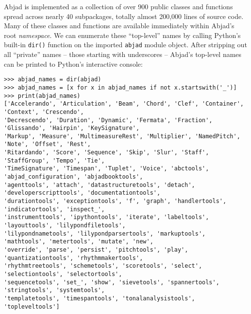 \noindent Abjad is implemented as a collection of over 900 public classes and
functions spread across nearly 40 subpackages, totally almost 200,000 lines of
source code. Many of these classes and functions are available immediately
within Abjad's root \emph{namespace}. We can enumerate these
\enquote{top-level} names by calling Python's built-in \texttt{dir()} function
on the imported \texttt{abjad} module object. After stripping out all
\enquote{private} names -- those starting with underscores -- Abjad's top-level
names can be printed to Python's interactive console:

\begin{comment}
<abjad>[text_width=105]
abjad_names = dir(abjad)
abjad_names = [x for x in abjad_names if not x.startswith('_')]
print(abjad_names)
</abjad>
\end{comment}

\begin{abjadbookoutput}
\begin{singlespacing}
\vspace{-0.5\baselineskip}
\begin{lstlisting}
>>> abjad_names = dir(abjad)
>>> abjad_names = [x for x in abjad_names if not x.startswith('_')]
>>> print(abjad_names)
['Accelerando', 'Articulation', 'Beam', 'Chord', 'Clef', 'Container', 'Context', 'Crescendo',
'Decrescendo', 'Duration', 'Dynamic', 'Fermata', 'Fraction', 'Glissando', 'Hairpin', 'KeySignature',
'Markup', 'Measure', 'MultimeasureRest', 'Multiplier', 'NamedPitch', 'Note', 'Offset', 'Rest',
'Ritardando', 'Score', 'Sequence', 'Skip', 'Slur', 'Staff', 'StaffGroup', 'Tempo', 'Tie',
'TimeSignature', 'Timespan', 'Tuplet', 'Voice', 'abctools', 'abjad_configuration', 'abjadbooktools',
'agenttools', 'attach', 'datastructuretools', 'detach', 'developerscripttools', 'documentationtools',
'durationtools', 'exceptiontools', 'f', 'graph', 'handlertools', 'indicatortools', 'inspect_',
'instrumenttools', 'ipythontools', 'iterate', 'labeltools', 'layouttools', 'lilypondfiletools',
'lilypondnametools', 'lilypondparsertools', 'markuptools', 'mathtools', 'metertools', 'mutate', 'new',
'override', 'parse', 'persist', 'pitchtools', 'play', 'quantizationtools', 'rhythmmakertools',
'rhythmtreetools', 'schemetools', 'scoretools', 'select', 'selectiontools', 'selectortools',
'sequencetools', 'set_', 'show', 'sievetools', 'spannertools', 'stringtools', 'systemtools',
'templatetools', 'timespantools', 'tonalanalysistools', 'topleveltools']
\end{lstlisting}
\end{singlespacing}
\end{abjadbookoutput}

